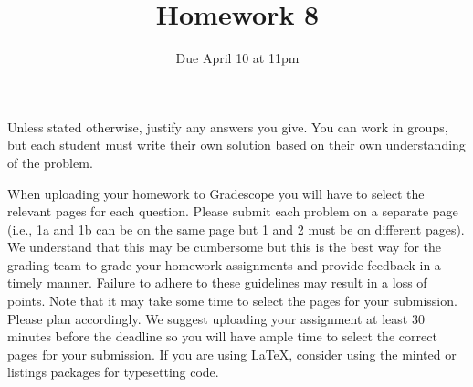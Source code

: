 \documentclass[12pt]{article}
\begin{document}
\title{\sc Homework 8}
\date{Due April 10 at 11pm} 
\author{}
\maketitle




\newtheorem*{problem}{Problem}
\newtheorem*{heuristic}{Heuristic}
\newtheorem*{conjecture}{Conjecture}
\newtheorem{theorem}{Theorem}[section]
\newtheorem{corollary}[theorem]{Corollary}
\newtheorem{prop}[theorem]{Proposition}
\newtheorem{lemma}[theorem]{Lemma}
\newtheorem{definition}[theorem]{Definition}
\theoremstyle{remark}
\newtheorem{example}[theorem]{Example}
\newtheorem{remark}[theorem]{Remark}
\newtheorem{exercise}[theorem]{Exercise}


Unless stated otherwise, justify any answers you give. You can work in groups, but each student
must write their own solution based on their own understanding of the problem.

When uploading your homework to Gradescope you will have to select the relevant pages
for each question. Please submit each problem on a separate page (i.e., 1a and 1b can be on
the same page but 1 and 2 must be on different pages). We understand that this may be
cumbersome but this is the best way for the grading team to grade your homework assignments and provide feedback in a timely manner. Failure to adhere to these guidelines may
result in a loss of points. Note that it may take some time to select the pages for your submission. Please plan accordingly. We suggest uploading your assignment at least 30 minutes
before the deadline so you will have ample time to select the correct pages for your submission. If you are using \LaTeX, consider using the minted or listings packages for typesetting code.

\medskip
\end{document}
